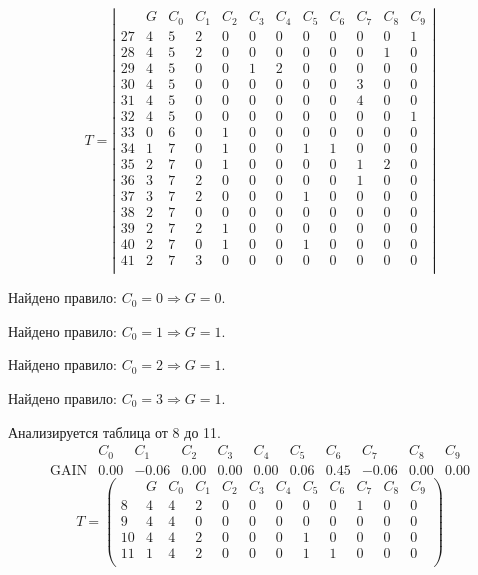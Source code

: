 $$
T = \left| \begin{array}{lc|c|ccccccccc}
	 & G & C_{0} & C_{1} & C_{2} & C_{3} & C_{4} & C_{5} & C_{6} & C_{7} & C_{8} & C_{9}\\
	27 & 4 & 5 & 2 & 0 & 0 & 0 & 0 & 0 & 0 & 0 & 1\\
	28 & 4 & 5 & 2 & 0 & 0 & 0 & 0 & 0 & 0 & 1 & 0\\
	29 & 4 & 5 & 0 & 0 & 1 & 2 & 0 & 0 & 0 & 0 & 0\\
	30 & 4 & 5 & 0 & 0 & 0 & 0 & 0 & 0 & 3 & 0 & 0\\
	31 & 4 & 5 & 0 & 0 & 0 & 0 & 0 & 0 & 4 & 0 & 0\\
	32 & 4 & 5 & 0 & 0 & 0 & 0 & 0 & 0 & 0 & 0 & 1\\
	33 & 0 & 6 & 0 & 1 & 0 & 0 & 0 & 0 & 0 & 0 & 0\\
	34 & 1 & 7 & 0 & 1 & 0 & 0 & 1 & 1 & 0 & 0 & 0\\
	35 & 2 & 7 & 0 & 1 & 0 & 0 & 0 & 0 & 1 & 2 & 0\\
	36 & 3 & 7 & 2 & 0 & 0 & 0 & 0 & 0 & 1 & 0 & 0\\
	37 & 3 & 7 & 2 & 0 & 0 & 0 & 1 & 0 & 0 & 0 & 0\\
	38 & 2 & 7 & 0 & 0 & 0 & 0 & 0 & 0 & 0 & 0 & 0\\
	39 & 2 & 7 & 2 & 1 & 0 & 0 & 0 & 0 & 0 & 0 & 0\\
	40 & 2 & 7 & 0 & 1 & 0 & 0 & 1 & 0 & 0 & 0 & 0\\
	41 & 2 & 7 & 3 & 0 & 0 & 0 & 0 & 0 & 0 & 0 & 0\\
\end{array} \right|
$$

Найдено правило: $C_{0} = 0 \Longrightarrow G = 0$.

Найдено правило: $C_{0} = 1 \Longrightarrow G = 1$.

Найдено правило: $C_{0} = 2 \Longrightarrow G = 1$.

Найдено правило: $C_{0} = 3 \Longrightarrow G = 1$.

Анализируется таблица от 8 до 11.
$$ 
\begin{array}{lcccccc|c|ccc}
	  & C_{0} & C_{1} & C_{2} & C_{3} & C_{4} & C_{5} & C_{6} & C_{7} & C_{8} & C_{9}\\
 \textrm{GAIN} & 0.00 & -0.06 & 0.00 & 0.00 & 0.00 & 0.06 & 0.45 & -0.06 & 0.00 & 0.00
\end{array}
 $$
$$
T = \left( \begin{array}{lccccccc|c|ccc}
	 & G & C_{0} & C_{1} & C_{2} & C_{3} & C_{4} & C_{5} & C_{6} & C_{7} & C_{8} & C_{9}\\
	8 & 4 & 4 & 2 & 0 & 0 & 0 & 0 & 0 & 1 & 0 & 0\\
	9 & 4 & 4 & 0 & 0 & 0 & 0 & 0 & 0 & 0 & 0 & 0\\
	10 & 4 & 4 & 2 & 0 & 0 & 0 & 1 & 0 & 0 & 0 & 0\\
	11 & 1 & 4 & 2 & 0 & 0 & 0 & 1 & 1 & 0 & 0 & 0\\
\end{array} \right)
$$


